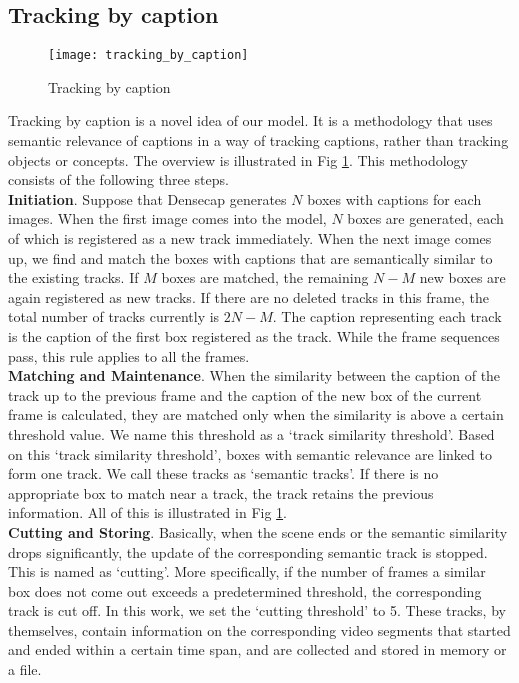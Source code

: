 \subsection{Tracking by caption}
\label{Trackingbycaption}

\begin{figure}[bp]
\texttt{[image: tracking\_by\_caption]}
\caption{Tracking by caption}
\label{fig:tracking_by_caption}
\end{figure}

Tracking by caption is a novel idea of our model. It is a methodology that uses semantic relevance of captions in a way of tracking captions, rather than tracking objects or concepts. 
The overview is illustrated in Fig \ref{fig:tracking_by_caption}. 
This methodology consists of the following three steps.\\
%
\textbf{Initiation}. Suppose that Densecap generates $N$ boxes with captions for each images. When the first image comes into the model, $N$ boxes are generated, each of which is registered as a new track immediately. When the next image comes up, we find and match the boxes with captions that are semantically similar to the existing tracks. If $M$ boxes are matched, the remaining $N-M$ new boxes are again registered as new tracks. If there are no deleted tracks in this frame, the total number of tracks currently is $2N-M$. The caption representing each track is the caption of the first box registered as the track. While the frame sequences pass, this rule applies to all the frames.\\
%
\textbf{Matching and Maintenance}. When the similarity between the caption of the track up to the previous frame and the caption of the new box of the current frame is calculated, they are matched only when the similarity is above a certain threshold value. We name this threshold as a `track similarity threshold'. Based on this `track similarity threshold', boxes with semantic relevance are linked to form one track. We call these tracks as `semantic tracks'. If there is no appropriate box to match near a track, the track retains the previous information. All of this is illustrated in Fig \ref{fig:tracking_by_caption}.\\
%
\textbf{Cutting and Storing}. Basically, when the scene ends or the semantic similarity drops significantly, the update of the corresponding semantic track is stopped. This is named as `cutting'. More specifically, if the number of frames a similar box does not come out exceeds a predetermined threshold, the corresponding track is cut off. In this work, we set the `cutting threshold' to 5. These tracks, by themselves, contain information on the corresponding video segments that started and ended within a certain time span, and are collected and stored in memory or a file.


